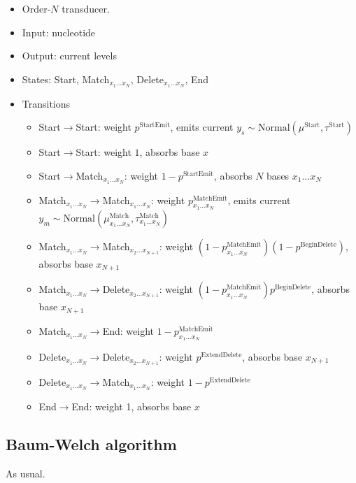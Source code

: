 \documentclass[10pt]{article}
\begin{document}
\begin{itemize}
\item Order-$N$ transducer.
\item Input: nucleotide
\item Output: current levels
\item States: Start, Match${}_{x_1 \ldots x_N}$, Delete${}_{x_1 \ldots x_N}$, End
\item Transitions
\begin{itemize}
\item Start$\to$Start: weight $p^{\mbox{StartEmit}}$, emits current $y_s \sim \mbox{Normal}(\mu^{\mbox{Start}},\tau^{\mbox{Start}})$
\item Start$\to$Start: weight $1$, absorbs base $x$
\item Start$\to$Match${}_{x_1 \ldots x_N}$: weight $1 - p^{\mbox{StartEmit}}$, absorbs $N$ bases $x_1 \ldots x_N$
\item Match${}_{x_1 \ldots x_N}\to$Match${}_{x_1 \ldots x_N}$: weight ${p^{\mbox{MatchEmit}}_{x_1\ldots x_N}}$, emits current $y_m \sim \mbox{Normal}(\mu^{\mbox{Match}}_{x_1\ldots x_N},\tau^{\mbox{Match}}_{x_1\ldots x_N})$
\item Match${}_{x_1 \ldots x_N}\to$Match${}_{x_2 \ldots x_{N+1}}$: weight $(1 - {p^{\mbox{MatchEmit}}_{x_1\ldots x_N}})(1 - p^{\mbox{BeginDelete}})$, absorbs base $x_{N+1}$
\item Match${}_{x_1 \ldots x_N}\to$Delete${}_{x_2 \ldots x_{N+1}}$: weight $(1 - {p^{\mbox{MatchEmit}}_{x_1\ldots x_N}}) p^{\mbox{BeginDelete}}$, absorbs base $x_{N+1}$
\item Match${}_{x_1 \ldots x_N}\to$End: weight $1 - {p^{\mbox{MatchEmit}}_{x_1\ldots x_N}}$
\item Delete${}_{x_1 \ldots x_N}\to$Delete${}_{x_2 \ldots x_{N+1}}$: weight $p^{\mbox{ExtendDelete}}$, absorbs base $x_{N+1}$
\item Delete${}_{x_1 \ldots x_N}\to$Match${}_{x_1 \ldots x_N}$: weight $1 - p^{\mbox{ExtendDelete}}$
\item End$\to$End: weight 1, absorbs base $x$
\end{itemize}
\end{itemize}




\subsection{Baum-Welch algorithm}

As usual.
\end{document}
